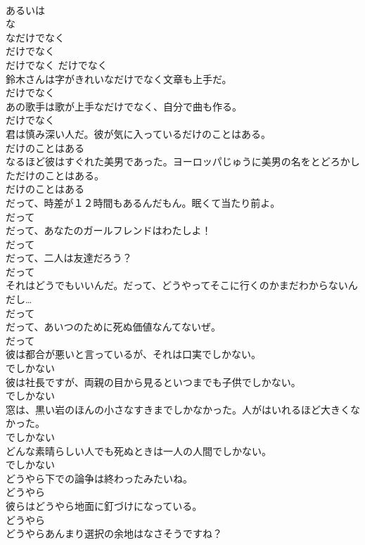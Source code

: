 \documentclass[8pt]{extreport}
\begin{document}
\begin{CJK}{UTF8}{min}
\\	あるいは
\\	な
\\	なだけでなく	
\\	だけでなく	
\\	だけでなく	だけでなく
\\	鈴木さんは字がきれいなだけでなく文章も上手だ。	
\\	だけでなく
\\	あの歌手は歌が上手なだけでなく、自分で曲も作る。	
\\	だけでなく
\\	君は慎み深い人だ。彼が気に入っているだけのことはある。	
\\	だけのことはある
\\	なるほど彼はすぐれた美男であった。ヨーロッパじゅうに美男の名をとどろかしただけのことはある。	
\\	だけのことはある
\\	だって、時差が１２時間もあるんだもん。眠くて当たり前よ。	
\\	だって
\\	だって、あなたのガールフレンドはわたしよ！	
\\	だって
\\	だって、二人は友達だろう？	
\\	だって
\\	それはどうでもいいんだ。だって、どうやってそこに行くのかまだわからないんだし…	
\\	だって
\\	だって、あいつのために死ぬ価値なんてないぜ。	
\\	だって
\\	彼は都合が悪いと言っているが、それは口実でしかない。	
\\	でしかない
\\	彼は社長ですが、両親の目から見るといつまでも子供でしかない。	
\\	でしかない
\\	窓は、黒い岩のほんの小さなすきまでしかなかった。人がはいれるほど大きくなかった。	
\\	でしかない
\\	どんな素晴らしい人でも死ぬときは一人の人間でしかない。	
\\	でしかない
\\	どうやら下での論争は終わったみたいね。	
\\	どうやら
\\	彼らはどうやら地面に釘づけになっている。	
\\	どうやら
\\	どうやらあんまり選択の余地はなさそうですね？	

\end{CJK}
\end{document}
